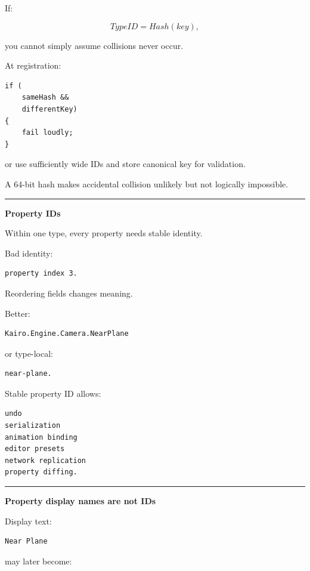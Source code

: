 If:

\[
TypeID=Hash(key),
\]

you cannot simply assume collisions never occur.

At registration:

\begin{verbatim}
if (
    sameHash &&
    differentKey)
{
    fail loudly;
}
\end{verbatim}

or use sufficiently wide IDs and store canonical key for validation.

A 64-bit hash makes accidental collision unlikely but not logically impossible.

\begin{center}\rule{0.5\linewidth}{0.5pt}\end{center}

\textbf{Property IDs}

Within one type, every property needs stable identity.

Bad identity:

\begin{verbatim}
property index 3.
\end{verbatim}

Reordering fields changes meaning.

Better:

\begin{verbatim}
Kairo.Engine.Camera.NearPlane
\end{verbatim}

or type-local:

\begin{verbatim}
near-plane.
\end{verbatim}

Stable property ID allows:

\begin{verbatim}
undo
serialization
animation binding
editor presets
network replication
property diffing.
\end{verbatim}

\begin{center}\rule{0.5\linewidth}{0.5pt}\end{center}

\textbf{Property display names are not IDs}

Display text:

\begin{verbatim}
Near Plane
\end{verbatim}

may later become:

